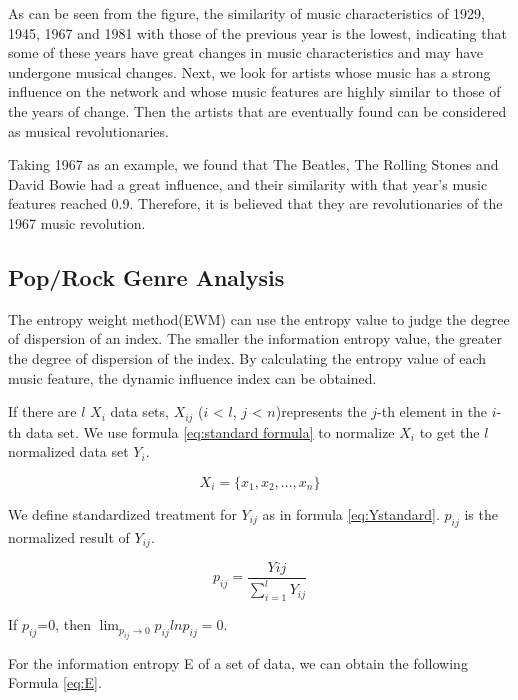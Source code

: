 \documentclass[12pt]{article}  %
\begin{document}
As can be seen from the figure, the similarity of music characteristics of 1929, 1945, 1967 and 1981 with those of the previous year is the lowest, indicating that some of these years have great changes in music characteristics and may have undergone musical changes. Next, we look for artists whose music has a strong influence on the network and whose music features are highly similar to those of the years of change. Then the artists that are eventually found can be considered as musical revolutionaries.\par


Taking 1967 as an example, we found that The Beatles, The Rolling Stones and David Bowie had a great influence, and their similarity with that year's music features reached 0.9. Therefore, it is believed that they are revolutionaries of the 1967 music revolution.


\subsection{Pop/Rock Genre Analysis}

The entropy weight method(EWM) can use the entropy value to judge the degree of dispersion of an index. The smaller the information entropy value, the greater the degree of dispersion of the index. By calculating the entropy value of each music feature, the dynamic influence index can be obtained. \par

If there are $l$ $X_i$ data sets, $X_{ij}$ ($i$ < $l$, $j$ < $n$)represents the $j$-th element in the $i$-th data set. We use formula \ref{eq:standard formula} to normalize $X_i$ to get the $l$ normalized data set $Y_i$.

\begin{equation}\label{eq:xdataset}
    X_i = \{ x_1,x_2,...,x_n\}
\end{equation}



We define standardized treatment for $Y_{ij}$ as in formula \ref{eq:Ystandard}. $p_{ij}$ is the normalized result of $Y_{ij}$.

\begin{equation}\label{eq:Ystandard}
    p_{ij}=\frac{Y{ij}}{\sum_{i=1}^{l}Y_{ij}}
\end{equation}

If $p_{ij}$=0, then $\lim_{p_{ij}\rightarrow 0} p_{ij}lnp_{ij}=0$.

For the information entropy E of a set of data, we can obtain the following Formula \ref{eq:E}.
\end{document}
